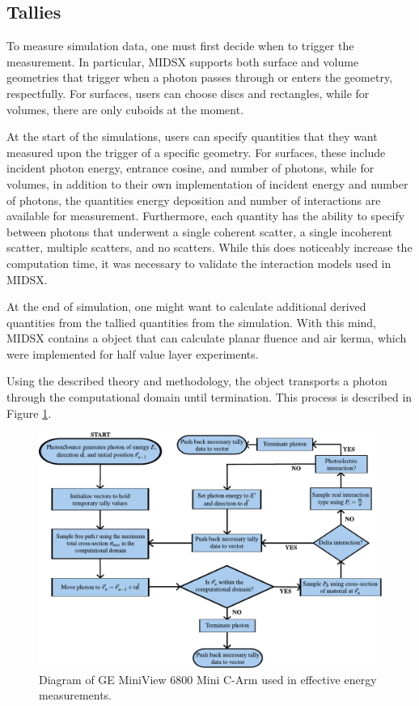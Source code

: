 \subsection{Tallies}
\par To measure simulation data, one must first decide when to trigger the measurement. In particular, MIDSX supports both surface and volume geometries that trigger when a photon passes through or enters the geometry, respectfully. For surfaces, users can choose discs and rectangles, while for volumes, there are only cuboids at the moment.
\par At the start of the simulations, users can specify quantities that they want measured upon the trigger of a specific geometry. For surfaces, these include incident photon energy, entrance cosine, and number of photons, while for volumes, in addition to their own implementation of incident energy and number of photons, the quantities energy deposition and number of interactions are available for measurement. Furthermore, each quantity has the ability to specify between photons that underwent a single coherent scatter, a single incoherent scatter, multiple scatters, and no scatters. While this does noticeably increase the computation time, it was necessary to validate the interaction models used in MIDSX.
\par At the end of simulation, one might want to calculate additional derived quantities from the tallied quantities from the simulation. With this mind, MIDSX contains a  object that can calculate planar fluence and air kerma, which were implemented for half value layer experiments.
\vspace{1cm}
\par Using the described theory and methodology, the object  transports a photon through the computational domain until termination. This process is described in Figure \ref{fig:PhysicsEngineFlowChart}.



\begin{figure}[H]
    \centering
	\includegraphics[width=1.0\textwidth]{../figures/physics_engine_flow_chart.pdf}
	\caption{Diagram of GE MiniView 6800 Mini C-Arm used in effective energy measurements.}
	\label{fig:PhysicsEngineFlowChart}
\end{figure}